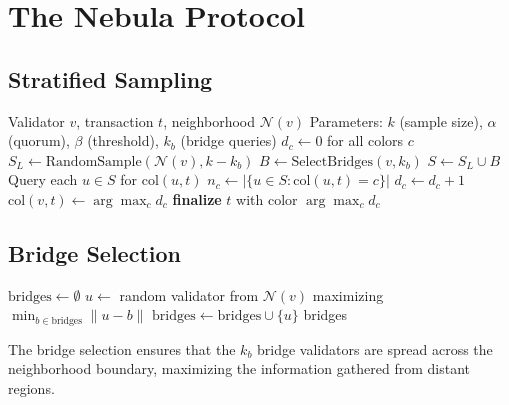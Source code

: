 \section{The Nebula Protocol}

\label{sec:nebula-protocol}

\subsection{Stratified Sampling}

\begin{algorithm}[H]
\caption{Nebula Protocol --- Stratified Neighborhood Sampling}
\label{alg:nebula-nebula-core}
\begin{algorithmic}[1]
\Require Validator $v$, transaction $t$, neighborhood $\mathcal{N}(v)$
\Require Parameters: $k$ (sample size), $\alpha$ (quorum), $\beta$ (threshold), $k_b$ (bridge queries)
\State $d_c \gets 0$ for all colors $c$
    \State {}
    \State $S_L \gets \text{RandomSample}(\mathcal{N}(v), k - k_b)$
    \State {}
    \State $B \gets \text{SelectBridges}(v, k_b)$ 
    \State $S \gets S_L \cup B$ 
    \State Query each $u \in S$ for $\text{col}(u, t)$
        \State $n_c \gets |\{u \in S : \text{col}(u, t) = c\}|$
            \State $d_c \gets d_c + 1$
        \EndIf
    \EndFor
    \State $\text{col}(v, t) \gets \arg\max_c d_c$
        \State \textbf{finalize} $t$ with color $\arg\max_c d_c$
    \EndIf
\EndWhile
\end{algorithmic}
\end{algorithm}

\subsection{Bridge Selection}

\begin{algorithm}[H]
\caption{Nebula Bridge Selection}
\label{alg:nebula-nebula-bridge}
\begin{algorithmic}[1]
    \State $\text{bridges} \gets \emptyset$
    \State {}
        \State $u \gets$ random validator from $\mathcal{N}(v)$ maximizing $\min_{b \in \text{bridges}} \|u - b\|$
        \State $\text{bridges} \gets \text{bridges} \cup \{u\}$
    \EndFor
    \State \Return bridges
\EndFunction
\end{algorithmic}
\end{algorithm}

The bridge selection ensures that the $k_b$ bridge validators are spread across
the neighborhood boundary, maximizing the information gathered from distant regions.

